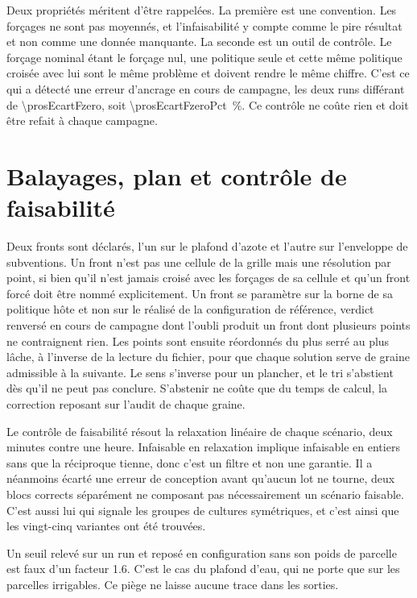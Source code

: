 Deux propriétés méritent d'être rappelées. La première est une convention. Les forçages ne
sont pas moyennés, et l'infaisabilité y compte comme le pire résultat et non comme une donnée
manquante. La seconde est un outil de contrôle. Le forçage nominal étant le forçage nul, une
politique seule et cette même politique croisée avec lui sont le même problème et doivent
rendre le même chiffre. C'est ce qui a détecté une erreur d'ancrage en cours de campagne, les
deux runs différant de \SI{\prosEcartFzero}{\euros}, soit
\SI{\prosEcartFzeroPct}{\percent}. Ce contrôle ne coûte rien et doit être refait à chaque
campagne.

\section{Balayages, plan et contrôle de faisabilité}

Deux fronts sont déclarés, l'un sur le plafond d'azote et l'autre sur l'enveloppe de
subventions. Un front n'est pas une cellule de la grille mais une résolution par point, si
bien qu'il n'est jamais croisé avec les forçages de sa cellule et qu'un front forcé doit être
nommé explicitement. Un front se paramètre sur la borne de sa politique hôte et non sur le
réalisé de la configuration de référence, verdict renversé en cours de campagne dont l'oubli
produit un front dont plusieurs points ne contraignent rien. Les points sont ensuite
réordonnés du plus serré au plus lâche, à l'inverse de la lecture du fichier, pour que chaque
solution serve de graine admissible à la suivante. Le sens s'inverse pour un plancher, et le
tri s'abstient dès qu'il ne peut pas conclure. S'abstenir ne coûte que du temps de calcul, la
correction reposant sur l'audit de chaque graine.

Le contrôle de faisabilité résout la relaxation linéaire de chaque scénario, deux minutes
contre une heure. Infaisable en relaxation implique infaisable en entiers sans que la
réciproque tienne, donc c'est un filtre et non une garantie. Il a néanmoins écarté une erreur
de conception avant qu'aucun lot ne tourne, deux blocs corrects séparément ne composant pas
nécessairement un scénario faisable. C'est aussi lui qui signale les groupes de cultures
symétriques, et c'est ainsi que les vingt-cinq variantes ont été trouvées.

\begin{vigilance}
Un seuil relevé sur un run et reposé en configuration sans son poids de parcelle est faux d'un
facteur \num{1.6}. C'est le cas du plafond d'eau, qui ne porte que sur les parcelles
irrigables. Ce piège ne laisse aucune trace dans les sorties.
\end{vigilance}
